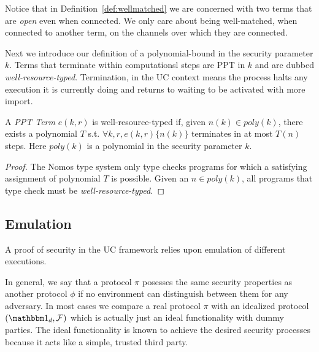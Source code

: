Notice that in Definition~\ref{def:wellmatched} we are concerned with two terms that are \textit{open} even when connected. 
We only care about being well-matched, when connected to another term, on the channels over which they are connected.

Next we introduce our definition of a polynomial-bound in the security parameter $k$.
Terms that terminate within computationsl steps are PPT in $k$ and are dubbed \textit{well-resource-typed}.
Termination, in the UC context means the process halts any execution it is currently doing and returns to waiting to be activated with more import.
\begin{theorem}[PPT in $k$]\label{thm:ppt}
A \textit{PPT Term} $e(k, r)$ is well-resource-typed if, given $n(k) \in poly(k)$, there exists a polynomial $T$ s.t. $\forall k, r, e(k, r) \{n(k)\}$  terminates in at most $T(n)$ steps. Here $poly(k)$ is a polynomial in the security parameter $k$.
\end{theorem}

\begin{proof}
The Nomos type system only type checks programs for which a satisfying assignment of polynomial $T$ is possible.
Given an $n \in poly(k)$, all programs that type check must be \textit{well-resource-typed.}
\end{proof}

\subsection{Emulation}
A proof of security in the UC framework relies upon emulation of different executions.

In general, we say that a protocol $\pi$ posesses the same security properties as another protocol $\phi$ if no environment can distinguish between them for any adversary.
In most cases we compare a real protocol $\pi$ with an idealized protocol $(\idealP, \F)$ which is actually just an ideal functionality with dummy parties.
The ideal functionality is known to achieve the desired security processes because it acts like a simple, trusted third party.

